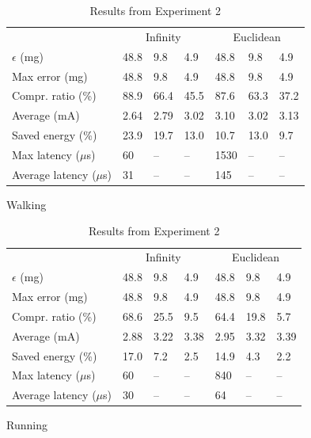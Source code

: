 \documentclass[10pt, conference, compsocconf]{IEEEtran}
\begin{document}
\begin{table}[]
   \begin{subfigure}{\columnwidth}
   \centering
   \begin{tabular}{l|l|l|l|l|l|l}
   \hline
   \rowcolor{headcolor}
                          & \multicolumn{3}{c|}{Infinity} & \multicolumn{3}{c}{Euclidean} \\
   \rowcolor{headcolor}
   $\epsilon$ (mg)             & 48.8    & 9.8      & 4.9   & 48.8   & 9.8   & 4.9   \\
   \hline
   Max error (mg)              & 48.8    & 9.8      & 4.9   & 48.8   & 9.8   & 4.9   \\
   Compr.      ratio (\%)      & 88.9    & 66.4     & 45.5  & 87.6   & 63.3  & 37.2  \\
   Average (mA)                & 2.64    & 2.79     & 3.02  & 3.10   & 3.02  & 3.13  \\
   Saved energy (\%)           & 23.9    & 19.7     & 13.0  &  10.7  & 13.0  & 9.7   \\
   Max latency ($\mu$s)& 60      & --       & --    & 1530   & --    & --    \\
   Average latency ($\mu$s) & 31 & --       & --    & 145    & --    & --    \\    
   \hline
   \end{tabular}
   \caption{Walking}
   \end{subfigure}
   \begin{subfigure}{\columnwidth}
   \centering
   \begin{tabular}{l|l|l|l|l|l|l}
   \hline
   \rowcolor{headcolor}

                     & \multicolumn{3}{c|}{Infinity} & \multicolumn{3}{c}{Euclidean} \\
    \rowcolor{headcolor}
   $\epsilon$ (mg)        & 48.8       & 9.8      & 4.9       & 48.8      & 9.8    & 4.9    \\
   \hline
   Max error (mg)         & 48.8       & 9.8      & 4.9       & 48.8      & 9.8    & 4.9   \\
   Compr.      ratio (\%) & 68.6       & 25.5     & 9.5       & 64.4      & 19.8   & 5.7   \\
   Average (mA)        & 2.88     & 3.22   & 3.38     & 2.95    & 3.32    & 3.39   \\
   Saved energy (\%)      & 17.0    & 7.2    & 2.5   & 14.9   & 4.3   & 2.2\\
   Max latency ($\mu$s)& 60      & --       & --    & 840   & --    & --    \\
   Average latency ($\mu$s) & 30 & --       & --    & 64    & --    & --    \\    
   \hline
   \end{tabular}
   \caption{Running}
   \end{subfigure}
   \caption{Results from Experiment 2}
   \label{table:results-energy}
\end{table}
\end{document}
